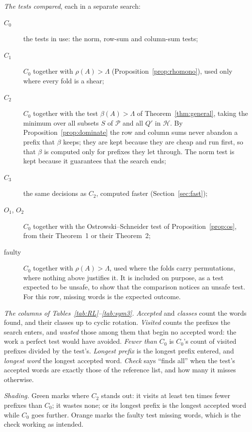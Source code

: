 \documentclass[11pt]{amsart}
\newcommand{\Lam}{\Lambda}
\newcommand{\Pos}{\mathcal{P}}
\newcommand{\Hgp}{\mathcal{H}}
\theoremstyle{plain}
\theoremstyle{definition}
\begin{document}
\emph{The tests compared}, each in a separate search:
\begin{description}
\item[$C_0$] the tests in use: the norm, row-sum and column-sum tests;
\item[$C_1$] $C_0$ together with $\rho(A)>\Lam$
  (Proposition~\ref{prop:rhomono}), used only where every fold is a shear;
\item[$C_2$] $C_0$ together with the test $\beta(A)>\Lam$ of
  Theorem~\ref{thm:general}, taking the minimum over all subsets $S$ of
  $\Pos$ and all $Q'$ in $\Hgp$.  By Proposition~\ref{prop:dominate} the row
  and column sums never abandon a prefix that $\beta$ keeps; they are kept
  because they are cheap and run first, so that $\beta$ is computed only
  for prefixes they let through.  The norm test is kept because it
  guarantees that the search ends;
\item[$C_3$] the same decisions as $C_2$, computed faster
  (Section~\ref{sec:fast});
\item[$O_1$, $O_2$] $C_0$ together with the Ostrowski--Schneider test of
  Proposition~\ref{prop:os}, from their Theorem~1 or their Theorem~2;
\item[faulty] $C_0$ together with $\rho(A)>\Lam$, used where the folds
  carry permutations, where nothing above justifies it.  It is included on
  purpose, as a test expected to be unsafe, to show that the comparison
  notices an unsafe test.  For this row, missing words is the expected
  outcome.
\end{description}

\emph{The columns of Tables~\ref{tab:RL}--\ref{tab:sym3}.}
\emph{Accepted} and \emph{classes} count the words found, and their
classes up to cyclic rotation.  \emph{Visited} counts the prefixes the
search enters, and \emph{wasted} those among them that begin no accepted
word: the work a perfect test would have avoided.  \emph{Fewer than
$C_0$} is $C_0$'s count of visited prefixes divided by the test's.
\emph{Longest prefix} is the longest prefix entered, and \emph{longest
word} the longest accepted word.  \emph{Check} says ``finds all'' when the
test's accepted words are exactly those of the reference list, and how
many it misses otherwise.

\emph{Shading.}  Green marks where $C_2$ stands out: it visits at least ten
times fewer prefixes than $C_0$; it wastes none; or its longest prefix is
the longest accepted word while $C_0$ goes further.  Orange marks the
faulty test missing words, which is the check working as intended.
\end{document}
